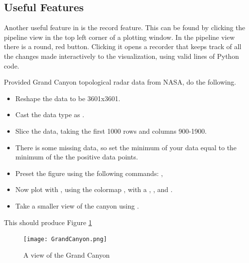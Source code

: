 \subsection*{Useful Features}
Another useful feature in  is the record feature.
This can be found by clicking the pipeline view in the top left corner of a plotting window.
In the pipeline view there is a round, red button.
Clicking it opens a recorder that keeps track of all the changes made interactively to the visualization, using valid lines of Python code.

\begin{problem}
Provided Grand Canyon topological radar data from NASA, do the following.

\begin{itemize}
\item Reshape the data to be 3601x3601.
\item Cast the data type as .
\item Slice the data, taking the first 1000 rows and columns 900-1900.
\item There is some missing data, so set the minimum of your data equal to the minimum of the the positive data points.
\item Preset the figure using the following commands: , 
\item Now plot with , using the colormap , with a , , and .
\item Take a smaller view of the canyon using .
\end{itemize}

This should produce Figure \ref{fig:GrandCanyon}

\end{problem}

\begin{figure}
\texttt{[image: GrandCanyon.png]}
\caption{A view of the Grand Canyon}
\label{fig:GrandCanyon}
\end{figure}

